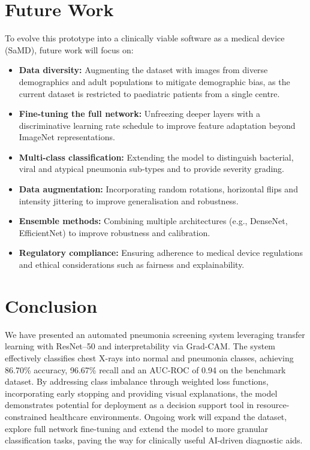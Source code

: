 \documentclass[sigconf]{acmart}
\begin{document}
\section{Future Work}
To evolve this prototype into a clinically viable software as a medical device (SaMD), future work will focus on:

\begin{itemize}
  \item \textbf{Data diversity:} Augmenting the dataset with images from diverse demographics and adult populations to mitigate demographic bias, as the current dataset is restricted to paediatric patients from a single centre.
  \item \textbf{Fine-tuning the full network:} Unfreezing deeper layers with a discriminative learning rate schedule to improve feature adaptation beyond ImageNet representations.
  \item \textbf{Multi-class classification:} Extending the model to distinguish bacterial, viral and atypical pneumonia sub-types and to provide severity grading.
  \item \textbf{Data augmentation:} Incorporating random rotations, horizontal flips and intensity jittering to improve generalisation and robustness.
  \item \textbf{Ensemble methods:} Combining multiple architectures (e.g., DenseNet, EfficientNet) to improve robustness and calibration.
  \item \textbf{Regulatory compliance:} Ensuring adherence to medical device regulations and ethical considerations such as fairness and explainability.
\end{itemize}

\section{Conclusion}
We have presented an automated pneumonia screening system leveraging transfer learning with ResNet--50 and interpretability via Grad-CAM. The system effectively classifies chest X-rays into normal and pneumonia classes, achieving 86.70\% accuracy, 96.67\% recall and an AUC-ROC of 0.94 on the benchmark dataset. By addressing class imbalance through weighted loss functions, incorporating early stopping and providing visual explanations, the model demonstrates potential for deployment as a decision support tool in resource-constrained healthcare environments. Ongoing work will expand the dataset, explore full network fine-tuning and extend the model to more granular classification tasks, paving the way for clinically useful AI-driven diagnostic aids.



\end{document}
